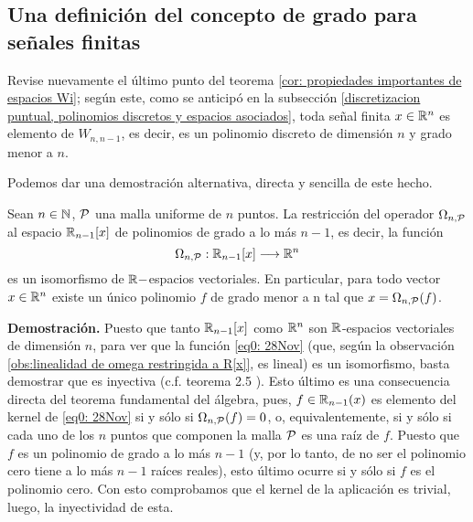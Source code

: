 \subsection{Una definición del concepto de grado para señales finitas}
\label{definicion del concepto de grado para seniales finitas}

Revise nuevamente el último punto del teorema
\ref{cor: propiedades importantes de espacios Wi}; según este,
como se anticipó en la subsección 
\ref{discretizacion puntual, polinomios discretos y espacios asociados},
toda señal finita $x \in \mathbb{R}^{n}$
es elemento de $W_{n,n-1}$,
es decir, es un polinomio discreto
de dimensión $n$ y grado menor a $n$.

Podemos dar una demostración
alternativa,
directa y sencilla de este hecho.

\begin{prop}
\label{prop: el operador de discretizacion puntual es un isomorfismo (...)}
Sean $n \in \mathbb{N}$, $\mathcal{P}$ una malla uniforme de $n$
puntos. 
La restricción del operador $\Omega_{n, \mathcal{P}}$
al espacio $\mathbb{R}_{n-1}[x]$ de polinomios de grado a lo más
$n-1$, es decir, la función 
\begin{equation}
\label{eq0: 28Nov}
\Omega_{n, \mathcal{P}}:
\mathbb{R}_{n-1}[x] \longrightarrow \mathbb{R}^{n}
\end{equation}
es un isomorfismo de $\mathbb{R}-$espacios vectoriales.
En particular, para todo vector $x \in \mathbb{R}^{n}$
existe un único polinomio $f$ de grado menor a n
tal que $x = \Omega_{n, \mathcal{P}}(f)$.
\end{prop}
\noindent
\textbf{Demostración.}
Puesto que tanto $\mathbb{R}_{n-1}[x]$
como $\mathbb{R}^{n}$ son $\mathbb{R}$-espacios vectoriales
de dimensión $n$, para ver que la función 
\eqref{eq0: 28Nov} (que, según la observación 
\ref{obs:linealidad de omega restringida a R[x]}, es lineal)
es un isomorfismo, basta
demostrar que es inyectiva 
(c.f. teorema 2.5 ).
Esto último es una consecuencia directa del 
teorema fundamental del álgebra,
pues, 
$f \in \mathbb{R}_{n-1}(x)$
es elemento del kernel
de \eqref{eq0: 28Nov} si y sólo si 
$\Omega_{n, \mathcal{P}}(f)=0$, o, equivalentemente,
si y sólo si 
cada uno de los $n$ puntos que componen la
malla $\mathcal{P}$ es una raíz de $f$. Puesto que
$f$ es un polinomio de grado a lo más $n-1$
(y, por lo tanto, de no ser el polinomio cero tiene
a lo más $n-1$ raíces reales),
esto último ocurre si y sólo si $f$ es el polinomio cero.
Con esto comprobamos que el kernel de la aplicación
\label{eq1: 25Nov} es trivial, luego, la inyectividad
de esta.
\QEDB
\vspace{0.2cm}

